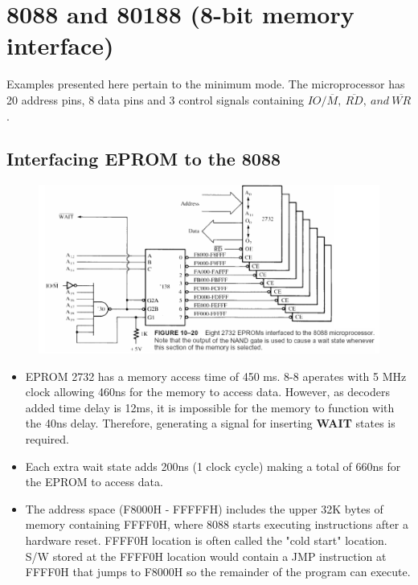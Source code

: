 \section{8088 and 80188 (8-bit memory interface)}
Examples presented here pertain to the minimum mode. The microprocessor has 20 address pins, 8 data pins and 3 control signals containing $IO/\overline{M},~\overline{RD},~and~\overline{WR}$.
\subsection{Interfacing EPROM to the 8088}

\begin{figure}[h!]
  \includegraphics[width = 1\textwidth]{./figures/EPROM1_2732.png}
\end{figure}
\begin{itemize}
  \item EPROM 2732 has a memory access time of 450 ms. 8-8 aperates with 5 MHz clock allowing 460ns for the memory to access data. However, as decoders added time delay is 12ms, it is impossible for the memory to function with the 40ns delay. Therefore, generating a signal for inserting \textbf{WAIT} states is required.
  \item Each extra wait state adds 200ns (1 clock cycle) making a total of 660ns for the EPROM to access data.
  \item The address space (F8000H - FFFFFH) includes the upper 32K bytes of memory containing FFFF0H, where 8088 starts executing instructions after a hardware reset. FFFF0H location is often called the "cold start" location. S/W stored at the FFFF0H location would contain a JMP instruction at FFFF0H that jumps to F8000H so the remainder of the program can execute.
\end{itemize}

